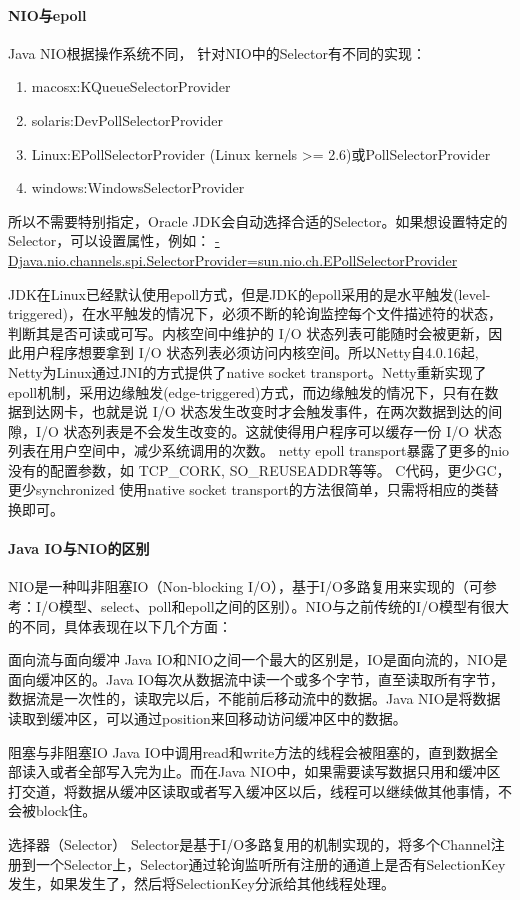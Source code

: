 \documentclass[../../../interview-questions.tex]{subfiles}
\begin{document}
\paragraph{NIO与epoll}

Java NIO根据操作系统不同， 针对NIO中的Selector有不同的实现：

\begin{enumerate}
\item{macosx:KQueueSelectorProvider}
\item{solaris:DevPollSelectorProvider}
\item{Linux:EPollSelectorProvider (Linux kernels >= 2.6)或PollSelectorProvider}
\item{windows:WindowsSelectorProvider}
\end{enumerate}
所以不需要特别指定，Oracle JDK会自动选择合适的Selector。如果想设置特定的Selector，可以设置属性，例如：
\url{-Djava.nio.channels.spi.SelectorProvider=sun.nio.ch.EPollSelectorProvider}

JDK在Linux已经默认使用epoll方式，但是JDK的epoll采用的是水平触发(level-triggered)，在水平触发的情况下，必须不断的轮询监控每个文件描述符的状态，判断其是否可读或可写。内核空间中维护的 I/O 状态列表可能随时会被更新，因此用户程序想要拿到 I/O 状态列表必须访问内核空间。所以Netty自4.0.16起, Netty为Linux通过JNI的方式提供了native socket transport。Netty重新实现了epoll机制，采用边缘触发(edge-triggered)方式，而边缘触发的情况下，只有在数据到达网卡，也就是说 I/O 状态发生改变时才会触发事件，在两次数据到达的间隙，I/O 状态列表是不会发生改变的。这就使得用户程序可以缓存一份 I/O 状态列表在用户空间中，减少系统调用的次数。
netty epoll transport暴露了更多的nio没有的配置参数，如 TCP\_CORK, SO\_REUSEADDR等等。
C代码，更少GC，更少synchronized
使用native socket transport的方法很简单，只需将相应的类替换即可。


\paragraph{Java IO与NIO的区别}

NIO是一种叫非阻塞IO（Non-blocking I/O），基于I/O多路复用来实现的（可参考：I/O模型、select、poll和epoll之间的区别）。NIO与之前传统的I/O模型有很大的不同，具体表现在以下几个方面：

面向流与面向缓冲
Java IO和NIO之间一个最大的区别是，IO是面向流的，NIO是面向缓冲区的。Java IO每次从数据流中读一个或多个字节，直至读取所有字节，数据流是一次性的，读取完以后，不能前后移动流中的数据。Java NIO是将数据读取到缓冲区，可以通过position来回移动访问缓冲区中的数据。

阻塞与非阻塞IO
Java IO中调用read和write方法的线程会被阻塞的，直到数据全部读入或者全部写入完为止。而在Java NIO中，如果需要读写数据只用和缓冲区打交道，将数据从缓冲区读取或者写入缓冲区以后，线程可以继续做其他事情，不会被block住。

选择器（Selector）
Selector是基于I/O多路复用的机制实现的，将多个Channel注册到一个Selector上，Selector通过轮询监听所有注册的通道上是否有SelectionKey发生，如果发生了，然后将SelectionKey分派给其他线程处理。
\end{document}

